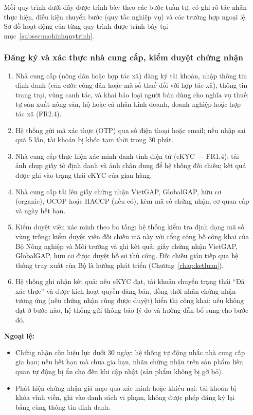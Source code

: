 Mỗi quy trình dưới đây được trình bày theo các bước tuần tự, có ghi rõ tác nhân thực hiện, điều kiện chuyển bước (quy tắc nghiệp vụ) và các trường hợp ngoại lệ. Sơ đồ hoạt động của từng quy trình được trình bày tại mục~\ref{subsec:mohinhquytrinh}.

\subsubsection*{Đăng ký và xác thực nhà cung cấp, kiểm duyệt chứng nhận}
\begin{enumerate}
    \item Nhà cung cấp (nông dân hoặc hợp tác xã) đăng ký tài khoản, nhập thông tin định danh (căn cước công dân hoặc mã số thuế đối với hợp tác xã), thông tin trang trại, vùng canh tác, và khai báo loại người bán dùng cho nghĩa vụ thuế: tự sản xuất nông sản, hộ hoặc cá nhân kinh doanh, doanh nghiệp hoặc hợp tác xã (FR2.4).
    \item Hệ thống gửi mã xác thực (OTP) qua số điện thoại hoặc email; nếu nhập sai quá 5 lần, tài khoản bị khóa tạm thời trong 30 phút.
    \item Nhà cung cấp thực hiện xác minh danh tính điện tử (eKYC --- FR1.4): tải ảnh chụp giấy tờ định danh và ảnh chân dung để hệ thống đối chiếu; kết quả được ghi vào trạng thái eKYC của gian hàng.
    \item Nhà cung cấp tải lên giấy chứng nhận VietGAP, GlobalGAP, hữu cơ (organic), OCOP hoặc HACCP (nếu có), kèm mã số chứng nhận, cơ quan cấp và ngày hết hạn.
    \item Kiểm duyệt viên xác minh theo ba tầng: hệ thống kiểm tra định dạng mã số vùng trồng; kiểm duyệt viên đối chiếu mã này với cổng công bố công khai của Bộ Nông nghiệp và Môi trường và ghi kết quả; giấy chứng nhận VietGAP, GlobalGAP, hữu cơ được duyệt hồ sơ thủ công. Đối chiếu gián tiếp qua hệ thống truy xuất của Bộ là hướng phát triển (Chương~\ref{chap:ketluan}).
    \item Hệ thống ghi nhận kết quả: nếu eKYC đạt, tài khoản chuyển trạng thái ``Đã xác thực'' và được kích hoạt quyền đăng bán, đồng thời nhãn chứng nhận tương ứng (nếu chứng nhận cũng được duyệt) hiển thị công khai; nếu không đạt ở bước nào, hệ thống gửi thông báo lý do và hướng dẫn bổ sung cho bước đó.
\end{enumerate}

\noindent\textbf{Ngoại lệ:}
\begin{itemize}
    \item Chứng nhận còn hiệu lực dưới 30 ngày: hệ thống tự động nhắc nhà cung cấp gia hạn; nếu hết hạn mà chưa gia hạn, nhãn chứng nhận trên sản phẩm liên quan tự động bị ẩn cho đến khi cập nhật (sản phẩm không bị gỡ bỏ).
    \item Phát hiện chứng nhận giả mạo qua xác minh hoặc khiếu nại: tài khoản bị khóa vĩnh viễn, ghi vào danh sách vi phạm, không được phép đăng ký lại bằng cùng thông tin định danh.
\end{itemize}

